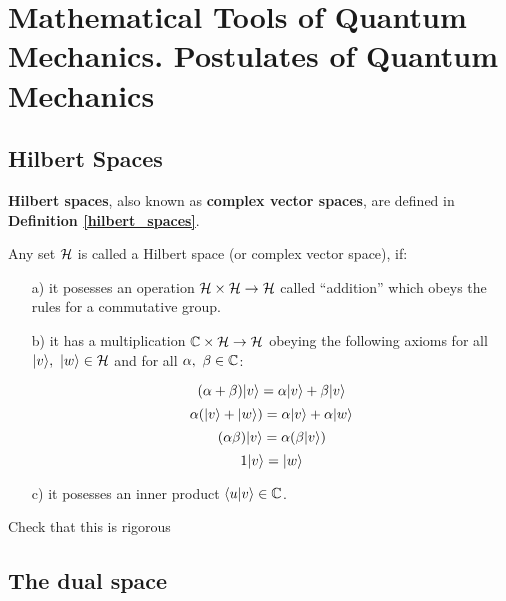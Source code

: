 \section{Mathematical Tools of Quantum Mechanics. Postulates of Quantum Mechanics}

\subsection{Hilbert Spaces}

\textbf{Hilbert spaces}, also known as \textbf{complex vector spaces}, are defined in \textbf{Definition \ref{hilbert_spaces}}.

\begin{definition} \label{hilbert_spaces}
    Any set $\mathcal{H}$ is called a Hilbert space (or complex vector space), if:
    
    \begin{enumerate}
        \item[a)] it posesses an operation $\mathcal{H} \times \mathcal{H} \to \mathcal{H}$ called ``addition'' which obeys the rules for a commutative group.
        \item[b)] it has a multiplication $\mathbb{C} \times \mathcal{H} \to \mathcal{H}$ obeying the following axioms for all $|v\rangle, \ |w\rangle \in \mathcal{H}$ and for all $\alpha, \ \beta \in \mathbb{C}$:

        \begin{equation}
            (\alpha + \beta) |v\rangle = \alpha |v\rangle + \beta |v\rangle
        \end{equation}
        \begin{equation}
            \alpha(|v\rangle + |w\rangle) = \alpha|v\rangle + \alpha|w\rangle
        \end{equation}
        \begin{equation}
            (\alpha\beta)|v\rangle = \alpha (\beta|v\rangle)
        \end{equation}
        \begin{equation}
            1 |v\rangle = |w\rangle
        \end{equation}
        \item[c)] it posesses an inner product $\langle u|v\rangle\in\mathbb{C}$.
    \end{enumerate}
    {\color{red}Check that this is rigorous}
\end{definition}

\subsection{The dual space} \label{dualspace}

